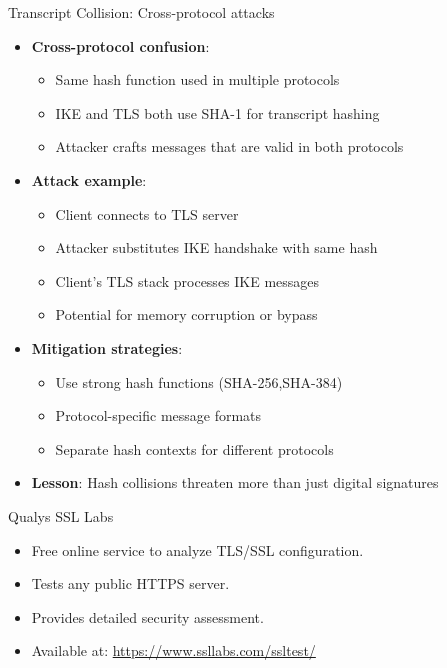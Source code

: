 \documentclass[aspectratio=169, lualatex, handout]{beamer}
\begin{document}
\begin{frame}{Transcript Collision: Cross-protocol attacks}
	\begin{itemize}
		\item \textbf{Cross-protocol confusion}:
		      \begin{itemize}
			      \item Same hash function used in multiple protocols
			      \item IKE and TLS both use SHA-1 for transcript hashing
			      \item Attacker crafts messages that are valid in both protocols
		      \end{itemize}
		\item \textbf{Attack example}:
		      \begin{itemize}
			      \item Client connects to TLS server
			      \item Attacker substitutes IKE handshake with same hash
			      \item Client's TLS stack processes IKE messages
			      \item Potential for memory corruption or bypass
		      \end{itemize}
		\item \textbf{Mitigation strategies}:
		      \begin{itemize}
			      \item Use strong hash functions (SHA-256,SHA-384)
			      \item Protocol-specific message formats
			      \item Separate hash contexts for different protocols
		      \end{itemize}
		\item \textbf{Lesson}: Hash collisions threaten more than just digital signatures
	\end{itemize}
\end{frame}

\begin{frame}{Qualys SSL Labs}
	\begin{itemize}
		\item Free online service to analyze TLS/SSL configuration.
		\item Tests any public HTTPS server.
		\item Provides detailed security assessment.
		\item Available at: \url{https://www.ssllabs.com/ssltest/}
	\end{itemize}
\end{frame}
\end{document}
